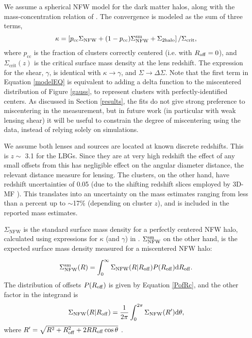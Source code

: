 We assume a spherical \acf{NFW} model \citep{nfw97} for the dark matter halos, along with the mass-concentration relation of \citet{Prada12}. The convergence is modeled as the sum of three terms,
\begin{equation}
\kappa = \left[p_{\mathrm{cc}}\Sigma_{\mathrm{NFW}} +(1-p_{\mathrm{cc}})\Sigma_{\mathrm{NFW}}^{\rm sm} + \Sigma_{\mathrm{2halo}} \right]/\Sigma_{\mathrm{crit}},
\label{modelEQ}
\end{equation}
where $p_{\mathrm{cc}}$ is the fraction of clusters correctly centered (i.e. with $R_{\rm{off}}=0$), and $\Sigma_{\mathrm{crit}}(z)$ is the critical surface mass density at the lens redshift. The expression for the shear, $\gamma$, is identical with $\kappa \rightarrow \gamma$, and $\Sigma \rightarrow \Delta\Sigma$. Note that the first term in Equation \ref{modelEQ} is equivalent to adding a delta function to the miscentered distribution of Figure \ref{gauss}, to represent clusters with perfectly-identified centers. As discussed in Section \ref{results}, the fits do not give strong preference to miscentering in the measurement, but in future work (in particular with weak lensing shear) it will be useful to constrain the degree of miscentering using the data, instead of relying solely on simulations.

We assume both lenses and sources are located at known discrete redshifts. This is $z \sim$ 3.1 for the \ac{LBG}s. Since they are at very high redshift the effect of any small offsets from this has negligible effect on the angular diameter distance, the relevant distance measure for lensing. The clusters, on the other hand, have redshift uncertainties of 0.05 (due to the shifting redshift slices employed by \ac{3D-MF} \citep{Milkeraitis10}). This translates into an uncertainty on the mass estimates ranging from less than a percent up to $\sim$17\% (depending on cluster $z$), and is included in the reported mass estimates.

$\Sigma_{\mathrm{NFW}}$ is the standard surface mass density for a perfectly centered \ac{NFW} halo, calculated using expressions for $\kappa$ (and $\gamma$) in \citet{Wright00}. $\Sigma_{\mathrm{NFW}}^{\rm sm}$ on the other hand, is the expected surface mass density measured for a miscentered \ac{NFW} halo:

\begin{equation}
\Sigma_{\rm NFW}^{\rm sm}(R)  = \int_0^\infty \Sigma_{\rm NFW}(R \vert R_{\rm{off}}) P(R_{\rm off}) \mathrm{d}R_{\rm off }.
\end{equation}
The distribution of offsets $P(R_{\rm{off}})$ is given by Equation \ref{PofRc}, and the other factor in the integrand is
\begin{equation}
\Sigma_{\mathrm{NFW}}(R \vert R_{\rm{off}}) = \frac{1}{2\pi} \int_0^{2\pi} \Sigma_{\mathrm{NFW}}(R') \mathrm{d}\theta,
\end{equation}
where $R' = \sqrt{R^2 + R_{\rm{off}}^2 + 2RR_{\rm{off}}\cos\theta}$ \citep{Yang06}.

